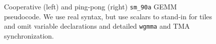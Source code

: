 \begin{figure}[tbp]
\sporkCodeRule
\fontsize{8}{9.6}\selectfont
\begin{minipage}[t]{0.465\linewidth}
\vspace{0pt}
\end{minipage}%
\hfill
\begin{minipage}[t]{0.515\linewidth}
\vspace{0pt}
\end{minipage}
\caption{Cooperative (left) and ping-pong (right) \texttt{sm\_90a} GEMM pseudocode.
We use real \sporkName{} syntax, but use scalars to stand-in for tiles and omit variable declarations
and detailed \texttt{wgmma} and TMA synchronization.}
\label{fig:PingPongListings}
\sporkCodeRule
\end{figure}
